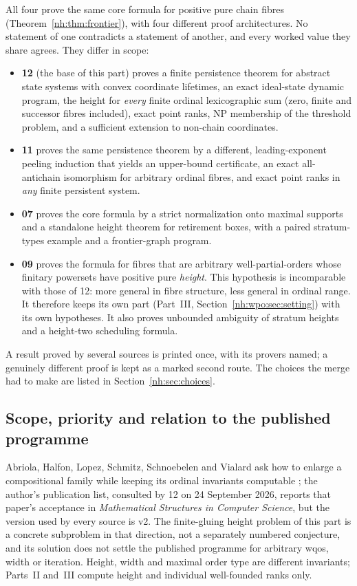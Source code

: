 \documentclass[11pt,a4paper]{article}
\theoremstyle{definition}
\theoremstyle{remark}
\begin{document}
All four prove the same core formula for positive pure chain fibres
(Theorem~\ref{nh:thm:frontier}), with four different proof architectures.
No statement of one contradicts a statement of another, and every worked
value they share agrees. They differ in scope:
\begin{itemize}
\item \textbf{12} (the base of this part) proves a finite persistence
theorem for abstract state systems with convex coordinate lifetimes, an
exact ideal-state dynamic program, the height for \emph{every} finite
ordinal lexicographic sum (zero, finite and successor fibres included),
exact point ranks, NP membership of the threshold problem, and a sufficient
extension to non-chain coordinates.
\item \textbf{11} proves the same persistence theorem by a different,
leading-exponent peeling induction that yields an upper-bound certificate,
an exact all-antichain isomorphism for arbitrary ordinal fibres, and exact
point ranks in \emph{any} finite persistent system.
\item \textbf{07} proves the core formula by a strict normalization onto
maximal supports and a standalone height theorem for retirement boxes,
with a paired stratum-types example and a frontier-graph program.
\item \textbf{09} proves the formula for fibres that are arbitrary
well-partial-orders whose finitary powersets have positive pure
\emph{height}. This hypothesis is incomparable with those of 12: more
general in fibre structure, less general in ordinal range. It therefore
keeps its own part (Part~III, Section~\ref{nh:wpo:sec:setting}) with its
own hypotheses. It also proves unbounded ambiguity of stratum heights and a
height-two scheduling formula.
\end{itemize}
A result proved by several sources is printed once, with its provers named;
a genuinely different proof is kept as a marked second route. The choices
the merge had to make are listed in Section~\ref{nh:sec:choices}.

\subsection{Scope, priority and relation to the published programme}
\label{nh:sec:scope}

Abriola, Halfon, Lopez, Schmitz, Schnoebelen and Vialard ask how to enlarge a
compositional family while keeping its ordinal invariants computable
\cite[Section~6]{AbriolaEtAl2024}; the author's publication list, consulted by
12 on 24 September 2026, reports that paper's acceptance in \emph{Mathematical
Structures in Computer Science}, but the version used by every source is v2.
The finite-gluing height problem of this part is a concrete subproblem in
that direction, not a separately numbered conjecture, and its solution does
not settle the published programme for arbitrary wqos, width or iteration.
Height, width and maximal order type are different invariants; Parts~II
and~III compute height and individual well-founded ranks only.
\end{document}
